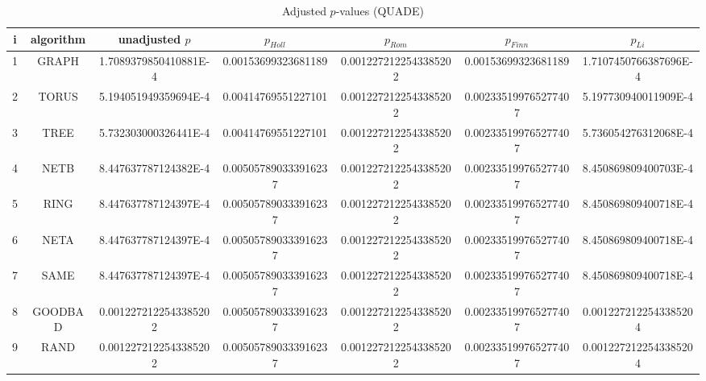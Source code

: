 \documentclass[a4paper,10pt]{article}
\begin{document}
\begin{landscape}
\begin{table}[!htp]
\centering\scriptsize
\caption{Adjusted $p$-values (QUADE)}
\begin{tabular}{ccccccc}
i&algorithm&unadjusted $p$&$p_{Holl}$&$p_{Rom}$&$p_{Finn}$&$p_{Li}$\\
\hline
1& GRAPH&1.7089379850410881E-4&0.00153699323681189&0.0012272122543385202&0.00153699323681189&1.7107450766387696E-4\\
2& TORUS&5.194051949359694E-4&0.00414769551227101&0.0012272122543385202&0.002335199765277407&5.197730940011909E-4\\
3& TREE&5.732303000326441E-4&0.00414769551227101&0.0012272122543385202&0.002335199765277407&5.736054276312068E-4\\
4& NETB&8.447637787124382E-4&0.005057890333916237&0.0012272122543385202&0.002335199765277407&8.450869809400703E-4\\
5& RING&8.447637787124397E-4&0.005057890333916237&0.0012272122543385202&0.002335199765277407&8.450869809400718E-4\\
6& NETA&8.447637787124397E-4&0.005057890333916237&0.0012272122543385202&0.002335199765277407&8.450869809400718E-4\\
7& SAME&8.447637787124397E-4&0.005057890333916237&0.0012272122543385202&0.002335199765277407&8.450869809400718E-4\\
8& GOODBAD&0.0012272122543385202&0.005057890333916237&0.0012272122543385202&0.002335199765277407&0.0012272122543385204\\
9& RAND&0.0012272122543385202&0.005057890333916237&0.0012272122543385202&0.002335199765277407&0.0012272122543385204\\
\hline
\end{tabular}
\end{table}

\end{landscape}
\end{document}
